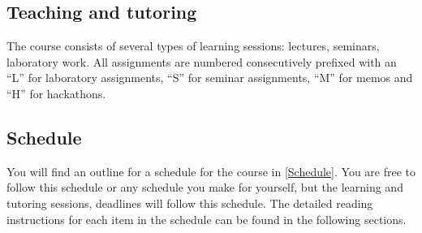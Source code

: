 \subsection{Teaching and tutoring}


The course consists of several types of learning sessions:
lectures, seminars, laboratory work.
All assignments are numbered consecutively prefixed with an \enquote{L} for 
laboratory assignments, \enquote{S} for seminar assignments, \enquote{M} for 
memos and \enquote{H} for hackathons.

\subsection{Schedule}

You will find an outline for a schedule for the course in \cref{Schedule}.
You are free to follow this schedule or any schedule you make for yourself, but 
the learning and tutoring sessions, deadlines \etc will follow this schedule.
The detailed reading instructions for each item in the schedule can be found in 
the following sections.

